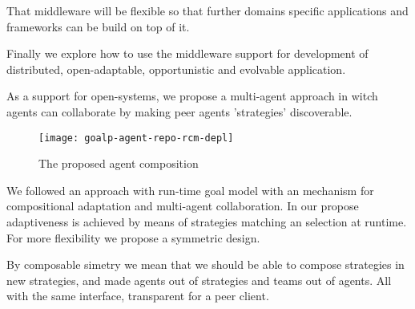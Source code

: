 That middleware will be flexible so that further domains specific applications and frameworks can be build on top of it.


Finally we explore how to use the middleware support for development of distributed, open-adaptable, opportunistic and evolvable application.

As a support for open-systems, we propose a multi-agent approach in witch agents can collaborate by making peer agents 'strategies' discoverable.

\begin{figure}
  \centering
  \texttt{[image: goalp-agent-repo-rcm-depl]}
  \caption{The proposed agent composition}
  \label{fig:agent_composition}
\end{figure}

We followed an approach with run-time goal model with an mechanism for compositional adaptation and multi-agent collaboration. In our propose adaptiveness is achieved by means of strategies matching an selection at runtime. For more flexibility we propose a symmetric design.

By composable simetry we mean that we should be able to compose strategies in new strategies, and made agents out of strategies and teams out of agents. All with the same interface, transparent for a peer client.
